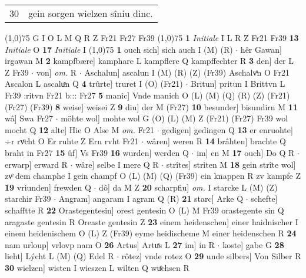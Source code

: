 \documentclass[8pt,a4paper,notitlepage]{article}
\begin{document}
\begin{table}[ht]
\begin{minipage}[t]{0.5\linewidth}
\begin{tabular}{rl}
30 & gein sorgen wielzen sîniu dinc.\\ 
\end{tabular}
\scriptsize
\line(1,0){75} \newline
G I O L M Q R Z Fr21 Fr27 Fr39 \newline
\line(1,0){75} \newline
\textbf{1} \textit{Initiale} I L R Z Fr21 Fr39  \textbf{13} \textit{Initiale} O  \textbf{17} \textit{Initiale} I  \newline
\line(1,0){75} \newline
\textbf{1} ouch sich] sich auch I (M) (R)  $\cdot$ hêr Gawan] irgawan M \textbf{2} kampfbære] kamphare L kampflere Q kampffechter R \textbf{3} den] der L Z Fr39  $\cdot$ von] \textit{om.} R  $\cdot$ Aschalun] ascalun I (M) (R) (Z) (Fr39) Aschalvͦn O Fr21 Ascalon L ascaluͯn Q \textbf{4} trûrte] truret I (O) (Fr21)  $\cdot$ Britun] pritun I Brittvn L Fr39 :ritvn Fr21 b::: Fr27 \textbf{5} manic] Vnde manich O (L) (M) (Q) (R) (Z) (Fr21) (Fr27) (Fr39) \textbf{8} weise] weisei Z \textbf{9} diu] der M (Fr27) \textbf{10} besunder] bisundirn M \textbf{11} wâ] Swa Fr27  $\cdot$ möhte wol] mohte wol G (O) (L) (M) Z (Fr21) (Fr27) Fr39 wol mocht Q \textbf{12} alte] Hie O Alse M \textit{om.} Fr21  $\cdot$ gedigen] gedingen Q \textbf{13} er enruohte] ÷r rvͦcht O Er ruhte Z Ern rvht Fr21  $\cdot$ wâren] weren R \textbf{14} brâhten] brachte Q braht in Fr27 \textbf{15} ûf] Vs Fr39 \textbf{16} wurden] werden Q  $\cdot$ im] en M \textbf{17} ouch] Do Q R  $\cdot$ erwarp] erward R  $\cdot$ wâre] selbe I mere Q R  $\cdot$ strîtes] striten M \textbf{18} gein strîte wol] zvͤ dem champhe I gein champf O (L) (M) (Q) (Fr39) ein knappen R zv kampfe Z \textbf{19} vriunden] frewden Q  $\cdot$ dô] da M Z \textbf{20} scharpfiu] \textit{om.} I starcke L (M) (Z) starchir Fr39  $\cdot$ Angram] angaram I agram Q (R) \textbf{21} starc] Arke Q  $\cdot$ schefte] schafftte R \textbf{22} Orastegentesin] orest gentesin O (L) M Fr39 orastegente sin Q aragaste gentesin R Oreaste gentesin Z \textbf{23} einem heidenschen] einer haidnischer I einem heidenischem O (L) Z (Fr39) eyme heidischeme M einer heidenschen R \textbf{24} nam urloup] vrlovp nam O \textbf{26} Artus] Artuͯs L \textbf{27} im] in R  $\cdot$ koste] gabe G \textbf{28} lieht] Lýcht L (M) (Q) Edel R  $\cdot$ rôtez] vnde rotez O \textbf{29} unde silbers] Von Silber R \textbf{30} wielzen] wisten I wieszen L wilten Q wuͦchsen R \newline
\end{minipage}
\hspace{0.5cm}

\end{table}
\end{document}
